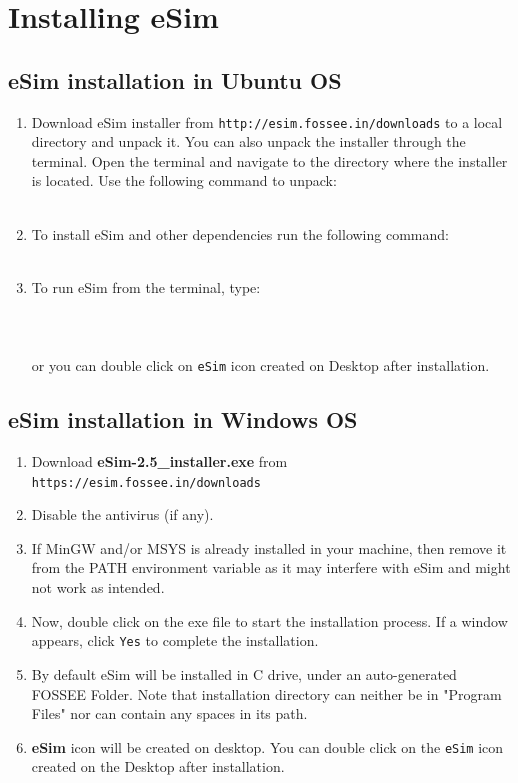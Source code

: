\chapter{Installing eSim}
\thispagestyle{empty}
\label{chap3}

\section {eSim installation in Ubuntu OS}
\begin{enumerate}
\item Download eSim installer from {\tt http://esim.fossee.in/downloads} to a local directory and unpack it. You can also unpack the  installer through the terminal. Open the terminal and navigate to the directory where the installer is located. Use the following command to unpack: \\
\\
\item To install eSim and other dependencies run the following command: \\
\\
\item To run eSim from the terminal, type: \\ 
\\
 \\
\\
  or you can double click on {\tt eSim} icon created on Desktop after installation.
\end{enumerate}


\section {eSim installation in Windows OS}
\begin{enumerate}
\item Download \textbf{eSim-2.5\_installer.exe} from  {\tt https://esim.fossee.in/downloads}
\item Disable the antivirus (if any). 
\item If MinGW and/or MSYS is already installed in your machine, then remove it from the PATH environment variable as it may interfere with eSim and might not work as intended.
\item Now, double click on the exe file to start the installation process. If a window appears, click {\tt Yes} to complete the installation.
\item By default eSim will be installed in C drive, under an auto-generated FOSSEE Folder. Note that installation directory can neither be in "Program Files" nor can contain any spaces in its path.
\item \textbf{eSim} icon will be created on desktop. You can double click on the {\tt eSim} icon created on the Desktop after installation.
\end{enumerate}

